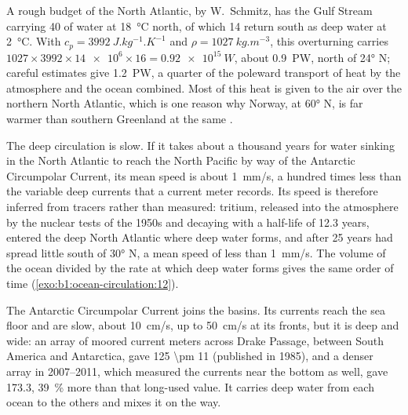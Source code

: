 A rough budget of the North Atlantic, by W.~Schmitz, has the Gulf Stream carrying
\qty{40}{\sverdrup} of water at \qty{18}{\celsius} north, of which
\qty{14}{\sverdrup} return south as deep water at \qty{2}{\celsius}. With $c_p =
\qty{3992}{J.kg^{-1}.K^{-1}}$ and $\rho = \qty{1027}{kg.m^{-3}}$, this overturning
carries $1027 \times 3992 \times \num{14e6} \times 16 = \qty{0.92e15}{W}$, about
\qty{0.9}{PW}, north of \ang{24} N; careful estimates give \qty{1.2}{PW}, a
quarter of the poleward transport of heat by the atmosphere and the ocean
combined. Most of this heat is given to the air over the northern North
Atlantic, which is one reason why Norway, at \ang{60} N, is far warmer than southern
Greenland at the same .

The deep circulation is slow. If it takes about a thousand years for water sinking
in the North Atlantic to reach the North Pacific by way of the Antarctic Circumpolar
Current, its mean speed is about \qty{1}{mm/s}, a hundred times less than the
variable deep currents that a current meter records. Its speed is therefore inferred
from tracers rather than measured: tritium, released into the atmosphere by the
nuclear tests of the 1950s and decaying with a half-life of 12.3 years, entered the
deep North Atlantic where deep water forms, and after 25 years had spread little
south of \ang{30} N, a mean speed of less than \qty{1}{mm/s}. The volume of the ocean
divided by the rate at which deep water forms gives the same order of time
(\cref{exo:b1:ocean-circulation:12}).

The Antarctic Circumpolar Current joins the basins. Its currents reach the sea floor
and are slow, about \qty{10}{cm/s}, up to \qty{50}{cm/s} at its fronts, but it is
deep and wide: an array of moored current meters across Drake Passage,
between South America and Antarctica, gave \qty[uncertainty-mode=separate]{125 \pm
11}{\sverdrup} (published in 1985), and a denser array in 2007--2011,
which measured the currents near the bottom as well, gave \qty{173.3}{\sverdrup},
\qty{39}{\percent} more than that long-used value. It carries deep water from each
ocean to the others and mixes it on the way.

